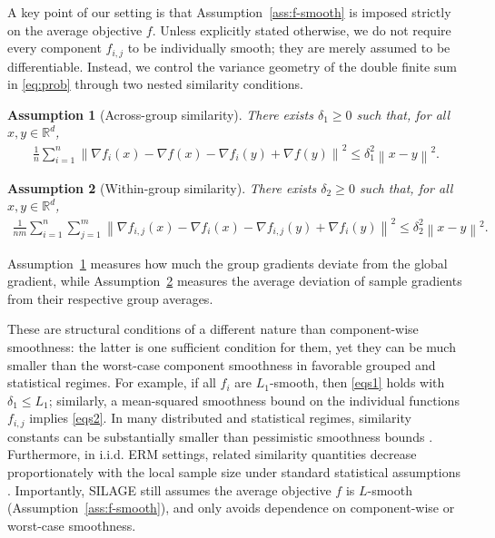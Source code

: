 \documentclass{article}
\newcommand{\bb}{\mathbb}
\newcommand{\R}{\bb R}
\newcommand{\sqn}[1]{\left\| #1 \right\|^2}
\theoremstyle{plain}
\newtheorem{assumption}{Assumption}
\newcommand{\algname}[1]{{\sf\scalefont{0.88}\color{mydarkgreen}#1}\xspace}
\def\algname#1{#1}%
\begin{document}
A key point of our setting is that Assumption~\ref{ass:f-smooth} is imposed strictly on the average objective $f$. Unless explicitly stated otherwise, we do not require every component $f_{i,j}$ to be individually smooth; they are merely assumed to be differentiable. Instead, we control the variance geometry of the double finite sum in \eqref{eq:prob} through two nested similarity conditions.


\begin{assumption}[Across-group similarity]\label{ass:delta1}
There exists $\delta_1\ge 0$ such that, for all $x,y\in\R^d$,
\begin{align}
    \frac1n\sum_{i=1}^n
    \sqn{
    \nabla f_i(x)-\nabla f(x)-\nabla f_i(y)+\nabla f(y)}
    \le \delta_1^2\sqn{x-y}.
    \label{eqs1}
\end{align}
\end{assumption}

\begin{assumption}[Within-group similarity]\label{ass:delta2}
There exists $\delta_2\ge 0$ such that, for all $x,y\in\R^d$,
\begin{align}
    \frac1{nm}\sum_{i=1}^n\sum_{j=1}^m
    \sqn{
    \nabla f_{i,j}(x)-\nabla f_i(x)-\nabla f_{i,j}(y)+\nabla f_i(y)}
    \le \delta_2^2\sqn{x-y}.
    \label{eqs2}
\end{align}
\end{assumption}

Assumption~\ref{ass:delta1} measures how much the group gradients deviate from the global gradient, while Assumption~\ref{ass:delta2} measures the average deviation of sample gradients from their respective group averages.

These are structural conditions of a different nature than component-wise smoothness: the latter is one sufficient condition for them, yet they can be much smaller than the worst-case component smoothness in favorable grouped and statistical regimes. For example, if all $f_i$ are $L_1$-smooth, then \eqref{eqs1} holds with $\delta_1\le L_1$; similarly, a mean-squared smoothness bound on the individual functions $f_{i,j}$ implies \eqref{eqs2}. In many distributed and statistical regimes, similarity constants can be substantially smaller than pessimistic smoothness bounds \citep{chayti2021linear,kovalev2022optimal,beznosikov2022compression,tian2022acceleration,horvath2022fedshuffle,khaled2022faster,karimireddy2020mime,CK22}. Furthermore, in i.i.d. ERM settings, related similarity quantities decrease proportionately with the local sample size under standard statistical assumptions \citep{vapnik1971uniform,zhang2018communication}. Importantly, \algname{SILAGE} still assumes the average objective $f$ is $L$-smooth (Assumption~\ref{ass:f-smooth}), and only avoids dependence on component-wise or worst-case smoothness.
\end{document}
